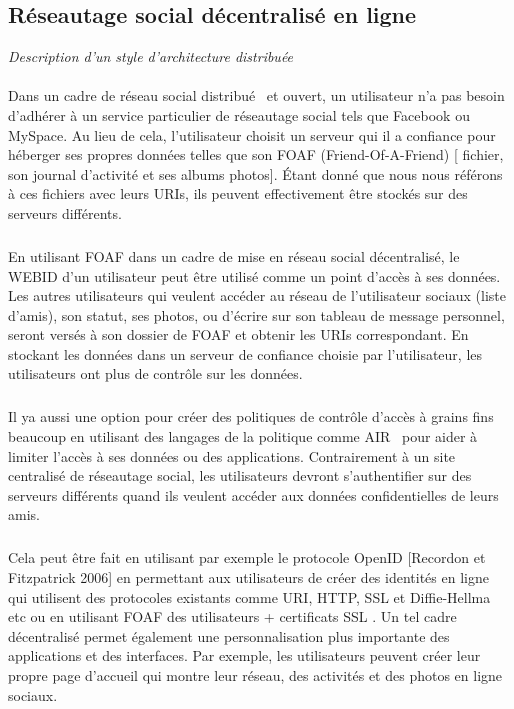 \subsection{Réseautage social décentralisé en ligne}
\textit{Description d'un style d'architecture distribuée}
\paragraph{}
Dans un cadre de réseau social distribué~\cite{eti} et ouvert, un utilisateur n'a pas besoin d'adhérer à un service particulier de réseautage social tels que Facebook ou MySpace. Au lieu de cela, l'utilisateur choisit un serveur qui il a confiance pour héberger ses propres données telles que son FOAF (Friend-Of-A-Friend) [ fichier, son journal d'activité et ses albums photos]. Étant donné que nous nous référons à ces fichiers avec leurs URIs, ils peuvent effectivement être stockés sur des serveurs différents.
\subparagraph{}
En utilisant FOAF dans un cadre de mise en réseau social décentralisé, le WEBID d'un utilisateur peut être utilisé comme un point d'accès à ses données. Les autres utilisateurs qui veulent accéder au réseau de l'utilisateur sociaux (liste d'amis), son statut, ses photos, ou d'écrire sur son tableau de message personnel, seront versés à son dossier de FOAF et obtenir les URIs correspondant. En stockant les données dans un serveur de confiance choisie par l'utilisateur, les utilisateurs ont plus de contrôle sur les données. 
\subparagraph{}
Il ya aussi une option pour créer des politiques de contrôle d'accès à grains fins beaucoup en utilisant des langages de la politique comme AIR~\cite{air} pour aider à limiter l'accès à ses données ou des applications. Contrairement à un site centralisé de réseautage social, les utilisateurs devront s'authentifier sur des serveurs différents quand ils veulent accéder aux données confidentielles de leurs amis. 
\subparagraph{}
Cela peut être fait en utilisant par exemple le protocole OpenID [Recordon et Fitzpatrick 2006] en permettant aux utilisateurs de créer des identités en ligne qui utilisent des protocoles existants comme URI, HTTP, SSL et Diffie-Hellma etc ou en utilisant FOAF des utilisateurs + certificats SSL . Un tel cadre décentralisé permet également une personnalisation plus importante des applications et des interfaces. Par exemple, les utilisateurs peuvent créer leur propre page d'accueil qui montre leur réseau, des activités et des photos en ligne sociaux.
